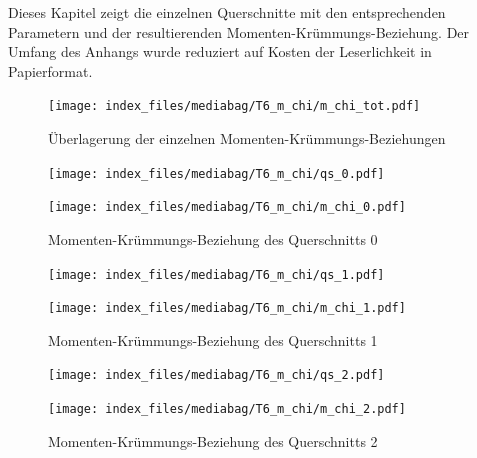 \documentclass[
  11pt,
  letterpaper,
]{scrreprt}
\begin{document}
Dieses Kapitel zeigt die einzelnen Querschnitte mit den entsprechenden
Parametern und der resultierenden Momenten-Krümmungs-Beziehung. Der
Umfang des Anhangs wurde reduziert auf Kosten der Leserlichkeit in
Papierformat.

\begin{figure}[H]

{\centering \texttt{[image: index\_files/mediabag/T6\_m\_chi/m\_chi\_tot.pdf]}

}

\caption{Überlagerung der einzelnen Momenten-Krümmungs-Beziehungen}

\end{figure}%

\begin{figure}[H]

\begin{minipage}{0.50\linewidth}
\texttt{[image: index\_files/mediabag/T6\_m\_chi/qs\_0.pdf]}\end{minipage}%
%
\begin{minipage}{0.50\linewidth}
\texttt{[image: index\_files/mediabag/T6\_m\_chi/m\_chi\_0.pdf]}\end{minipage}%

\caption{\label{fig-mchi_anhang}Momenten-Krümmungs-Beziehung des
Querschnitts 0}

\end{figure}%

\begin{figure}[H]

\begin{minipage}{0.50\linewidth}
\texttt{[image: index\_files/mediabag/T6\_m\_chi/qs\_1.pdf]}\end{minipage}%
%
\begin{minipage}{0.50\linewidth}
\texttt{[image: index\_files/mediabag/T6\_m\_chi/m\_chi\_1.pdf]}\end{minipage}%

\caption{\label{fig-mchi_anhang}Momenten-Krümmungs-Beziehung des
Querschnitts 1}

\end{figure}%

\begin{figure}[H]

\begin{minipage}{0.50\linewidth}
\texttt{[image: index\_files/mediabag/T6\_m\_chi/qs\_2.pdf]}\end{minipage}%
%
\begin{minipage}{0.50\linewidth}
\texttt{[image: index\_files/mediabag/T6\_m\_chi/m\_chi\_2.pdf]}\end{minipage}%

\caption{\label{fig-mchi_anhang}Momenten-Krümmungs-Beziehung des
Querschnitts 2}

\end{figure}%
\end{document}

